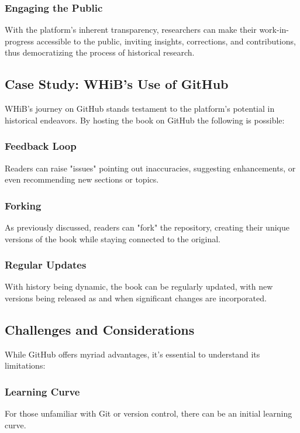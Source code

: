 \documentclass[a4paper,12pt]{book}
\begin{document}
\subsubsection*{Engaging the Public}
With the platform's inherent transparency, researchers can make their work-in-progress accessible to the public, inviting insights, corrections, and contributions, thus democratizing the process of historical research.

\subsection*{Case Study: WHiB's Use of GitHub}
WHiB's journey on GitHub stands testament to the platform's potential in historical endeavors. By hosting the book on GitHub the following is possible:

\subsubsection*{Feedback Loop}
Readers can raise "issues" pointing out inaccuracies, suggesting enhancements, or even recommending new sections or topics.

\subsubsection*{Forking}
As previously discussed, readers can "fork" the repository, creating their unique versions of the book while staying connected to the original.

\subsubsection*{Regular Updates}
With history being dynamic, the book can be regularly updated, with new versions being released as and when significant changes are incorporated.

\subsection*{Challenges and Considerations}
While GitHub offers myriad advantages, it's essential to understand its limitations:

\subsubsection*{Learning Curve}
For those unfamiliar with Git or version control, there can be an initial learning curve.
\end{document}
